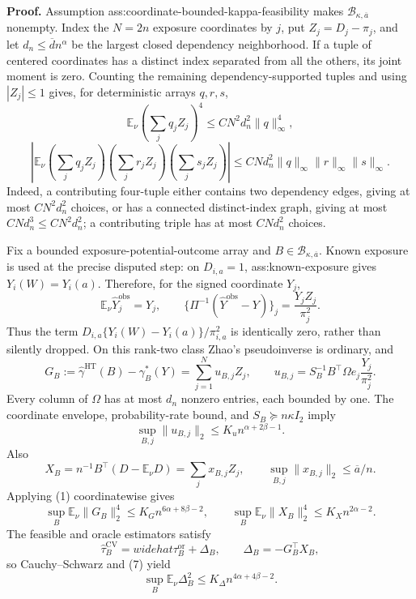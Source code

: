 \textbf{Proof.}
Assumption ass:coordinate-bounded-kappa-feasibility makes \(\mathcal B_{\kappa,\overline a}\) nonempty.  Index the \(N=2n\) exposure coordinates by \(j\), put \(Z_j=D_j-\pi_j\), and let \(d_n\le\overline d n^\alpha\) be the largest closed dependency neighborhood.  If a tuple of centered coordinates has a distinct index separated from all the others, its joint moment is zero.  Counting the remaining dependency-supported tuples and using \(|Z_j|\le1\) gives, for deterministic arrays \(q,r,s\),
\[
\mathbb E_\nu\left(\sum_jq_jZ_j\right)^4
\le C N^2d_n^2\lVert q\rVert_\infty^4,
\tag{1}
\]
\[
\left|\mathbb E_\nu
\left(\sum_jq_jZ_j\right)
\left(\sum_jr_jZ_j\right)
\left(\sum_js_jZ_j\right)\right|
\le C Nd_n^2\lVert q\rVert_\infty\lVert r\rVert_\infty\lVert s\rVert_\infty.
\tag{2}
\]
Indeed, a contributing four-tuple either contains two dependency edges, giving at most \(CN^2d_n^2\) choices, or has a connected distinct-index graph, giving at most \(CN d_n^3\le CN^2d_n^2\); a contributing triple has at most \(CN d_n^2\) choices.

Fix a bounded exposure-potential-outcome array and \(B\in\mathcal B_{\kappa,\overline a}\).  Known exposure is used at the precise disputed step: on \(D_{i,a}=1\), ass:known-exposure gives \(Y_i(W)=Y_i(a)\).  Therefore, for the signed coordinate \(Y_j\),
\[
\mathbb E_\nu\widehat Y_j^{\mathrm{obs}}=Y_j,
\qquad
\{\Pi^{-1}(\widehat Y^{\mathrm{obs}}-Y)\}_j
=\frac{Y_jZ_j}{\pi_j^2}.
\tag{3}
\]
Thus the term \(D_{i,a}\{Y_i(W)-Y_i(a)\}/\pi_{i,a}^2\) is identically zero, rather than silently dropped.  On this rank-two class Zhao's pseudoinverse is ordinary, and
\[
G_B:=\widehat\gamma^{\mathrm{HT}}(B)-\gamma_B^*(Y)
=\sum_{j=1}^{N}u_{B,j}Z_j,
\qquad
u_{B,j}=S_B^{-1}B^\top\Omega e_j\frac{Y_j}{\pi_j^2}.
\tag{4}
\]
Every column of \(\Omega\) has at most \(d_n\) nonzero entries, each bounded by one.  The coordinate envelope, probability-rate bound, and \(S_B\succeq n\kappa I_2\) imply
\[
\sup_{B,j}\lVert u_{B,j}\rVert_2
\le K_u n^{\alpha+2\beta-1}.
\tag{5}
\]
Also
\[
X_B=n^{-1}B^\top(D-\mathbb E_\nu D)
=\sum_jx_{B,j}Z_j,
\qquad
\sup_{B,j}\lVert x_{B,j}\rVert_2\le\overline a/n.
\tag{6}
\]
Applying (1) coordinatewise gives
\[
\sup_B\mathbb E_\nu\lVert G_B\rVert_2^4
\le K_Gn^{6\alpha+8\beta-2},
\qquad
\sup_B\mathbb E_\nu\lVert X_B\rVert_2^4
\le K_Xn^{2\alpha-2}.
\tag{7}
\]
The feasible and oracle estimators satisfy
\[
\widehat\tau_B^{\mathrm{CV}}=widehat\tau_B^{\mathrm{or}}+\Delta_B,
\qquad \Delta_B=-G_B^\top X_B,
\]
so Cauchy--Schwarz and (7) yield
\[
\sup_B\mathbb E_\nu\Delta_B^2
\le K_\Delta n^{4\alpha+4\beta-2}.
\tag{8}
\]

